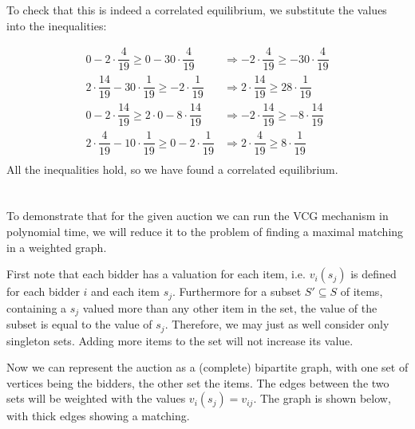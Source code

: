 \documentclass[11pt,journal]{article}
\begin{document}
	To check that this is indeed a correlated equilibrium, we substitute the values into the inequalities:
	
	\begin{align*}
		0 - 2\cdot \dfrac{4}{19} \geq 0 - 30 \cdot \dfrac{4}{19}  &\Longrightarrow -2 \cdot \dfrac{4}{19} \geq -30 \cdot \dfrac{4}{19}  \\
		2\cdot \dfrac{14}{19} -30 \cdot \dfrac{1}{19} \geq -2 \cdot \dfrac{1}{19} & \Longrightarrow 2 \cdot \dfrac{14}{19} \geq 28 \cdot \dfrac{1}{19}  \\
		0 - 2 \cdot \dfrac{14}{19}  \geq 2 \cdot 0 - 8 \cdot \dfrac{14}{19} &  \Longrightarrow -2 \cdot \dfrac{14}{19} \geq -8 \cdot \dfrac{14}{19} \\
		2 \cdot \dfrac{4}{19} -10 \cdot \dfrac{1}{19} \geq 0 - 2 \cdot \dfrac{1}{19} & \Longrightarrow 2 \cdot \dfrac{4}{19} \geq 8 \cdot \dfrac{1}{19}  \\
	\end{align*}
	All the inequalities hold, so we have found a correlated equilibrium. 
	
	\section{} 
	To demonstrate that for the given auction we can run the VCG mechanism in polynomial time, we will reduce it to the problem of finding a maximal matching in a weighted graph.
	
	First note that each bidder has a valuation for each item, i.e. $v_i(s_j)$ is defined for each bidder $i$ and each item $s_j$. Furthermore for a subset $S'\subseteq S$ of items, containing a $s_j$ valued more than any other item in the set, the value of the subset is equal to the value of $s_j$. Therefore, we may just as well consider only singleton sets. Adding more items to the set will not increase its value.
	
	Now we can represent the auction as a (complete) bipartite graph, with one set of vertices being the bidders, the other set the items. The edges between the two sets will be weighted with the values $v_i(s_j) = v_{ij}$. The graph is shown below, with thick edges showing a matching.
	
\end{document}
